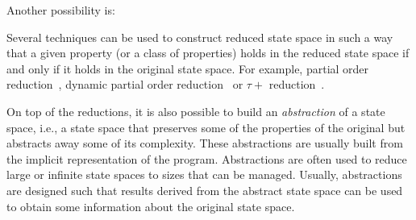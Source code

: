\begin{definition}
{Another possibility is:\\
}
\end{definition}

Several techniques can be used to construct reduced state space in such a way that a given property (or a class of properties) holds in the reduced state space if and only if it holds in the original state space.
For example, partial order reduction~, dynamic partial order reduction~ or $\tau+$ reduction~.


On top of the reductions, it is also possible to build an \emph{abstraction} of a state space, i.e., a state space that preserves some of the properties of the original but abstracts away some of its complexity.
These abstractions are usually built from the implicit representation of the program.
Abstractions are often used to reduce large or infinite state spaces to sizes that can be managed.
Usually, abstractions are designed such that results derived from the abstract state space can be used to obtain some information about the original state space.

